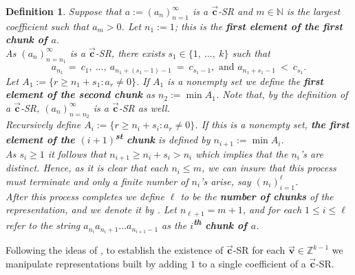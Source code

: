 \documentclass[]{interact}
\newcommand{\Z}{{\mathbb Z}}  %
\let\emph\relax %
\newcommand{\vtr}[1]{\vec{\mathbf{#1}}}
\theoremstyle{plain}
\numberwithin{equation}{section} %
\newtheorem{definition}[thm]{Definition}
\numberwithin{table}{section} %
\numberwithin{figure}{section}
\begin{document}
\begin{definition}\label{Def: Chunks}
    Suppose that $a:=(a_n)_{n=1}^\infty$ is a $\vtr{c}$-SR and $m\in \mathbb{N}$ is the largest coefficient such that $a_m>0$.
    Let $n_1:=1$; this is the \textbf{\textit{first element of the first chunk of $a$}}.\\
 
    \noindent As $(a_n)_{n=n_1}^\infty$ is a $\vtr{c}$-SR, there exists $s_1 \in \{1,\ \ldots, \ k\}$ such that
    \[
    a_{n_1}\ =\ c_1,\ \ldots,\ a_{n_1 +(s_1-1) -1}\ =\ c_{s_1-1}, \text{ and } a_{n_1+s_1-1}\ <\ c_{s_1}. 
    \]
    Let $A_1 := \{r \geq n_1+s_1 : a_r \neq 0 \}$. If $A_1$ is a nonempty set we define the \textbf{\textit{first element of the second chunk}} as $n_2:=\min A_1$. Note that, by the definition of a $\vtr{c}$-SR, $(a_n)_{n=n_2}^\infty$ is a $\vtr{c}$-SR as well.\\
    
    \noindent Recursively define $A_i:=\{r\geq n_i + s_i : a_r \neq 0 \}$. If this is a nonempty set, \textbf{\textit{the first element of the $(i+1)$\textsuperscript{\rm st} chunk}} is defined by $n_{i+1}:=\min A_i$.\\
    
    As $s_i \geq 1$ it follows that $n_{i+1} \geq n_i+s_i > n_i$ which implies that the $n_i$'s are distinct. Hence, as it is clear that each $n_i\leq m$, we can insure that this process must terminate and only a finite number of $n_i$'s arise, say $(n_i)_{i=1}^\ell$.\\ 
    
    After this process completes we define $\ell$ to be the \textit{\textbf{number of chunks}} of the representation, and we denote it by \emph{$CH(a)$}. Let $n_{\ell+1}=m+1$, and for each $1\leq i\leq \ell$ refer to the string $a_{n_i}a_{n_i+1}\dots  a_{n_{i+1}-1}$ as the \textbf{$i$\textsuperscript{\rm th} \textit{chunk} of $a$}. 

\end{definition}

Following the ideas of \textcolor{blue}{\cite{ABJ11}}, to establish the existence of $\vtr{c}$-SR for each $\vtr{v}\in \Z^{k-1}$ we manipulate representations built by adding $1$ to a single coefficient of a $\vtr{c}$-SR.
\end{document}
